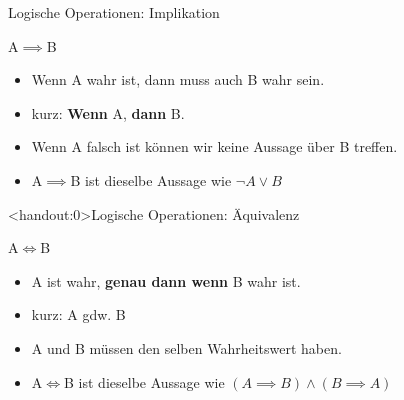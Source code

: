 \begin{frame}{Logische Operationen: Implikation}
\begin{alertblock}{A$\implies$B}
\begin{itemize}
    \item \glqq Wenn A wahr ist, dann muss auch B wahr sein.\grqq
    \item kurz: \glqq\textbf{Wenn} A, \textbf{dann} B.\grqq
    \item Wenn A falsch ist können wir keine Aussage über B treffen.
    \item A$\implies$B ist dieselbe Aussage wie $\neg A \vee B$
\end{itemize}
\end{alertblock}
\end{frame}

\begin{frame}<handout:0>{Logische Operationen: Äquivalenz}
\begin{alertblock}{A$\iff$B}
\begin{itemize}
    \item \glqq A ist wahr, \textbf{genau dann wenn} B wahr ist.\grqq
    \item kurz: \glqq A gdw. B\grqq
    \item A und B müssen den selben Wahrheitswert haben.
    \item A$\iff$B ist dieselbe Aussage wie $(A \implies B) \wedge (B \implies A)$
\end{itemize}
\end{alertblock}
\end{frame}

